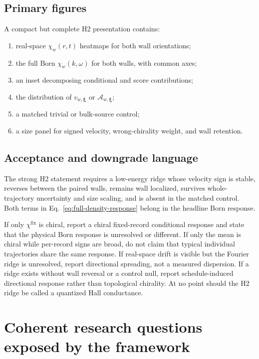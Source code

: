\documentclass[aps,prb,onecolumn,nofootinbib,superscriptaddress]{revtex4-2}
\newcommand{\bxi}{\bm{\xi}}
\newcommand{\fixed}{\mathrm{fix}}
\begin{document}
\subsection{Primary figures}

A compact but complete H2 presentation contains:
\begin{enumerate}
  \item real-space $\chi_w(r,t)$ heatmaps for both wall orientations;
  \item the full Born $\chi_w(k,\omega)$ for both walls, with common axes;
  \item an inset decomposing conditional and score contributions;
  \item the distribution of $v_{w,\bxi}$ or $\mathcal A_{w,\bxi}$;
  \item a matched trivial or bulk-source control;
  \item a size panel for signed velocity, wrong-chirality weight, and wall
  retention.
\end{enumerate}

\subsection{Acceptance and downgrade language}

The strong H2 statement requires a low-energy ridge whose velocity sign is
stable, reverses between the paired walls, remains wall localized, survives
whole-trajectory uncertainty and size scaling, and is absent in the matched
control.  Both terms in Eq.~\eqref{eq:full-density-response} belong in the
headline Born response.

If only $\chi^{\fixed}$ is chiral, report a chiral fixed-record conditional
response and state that the physical Born response is unresolved or different.
If only the mean is chiral while per-record signs are broad, do not claim that
typical individual trajectories share the same response.  If real-space drift
is visible but the Fourier ridge is unresolved, report directional spreading,
not a measured dispersion.  If a ridge exists without wall reversal or a
control null, report schedule-induced directional response rather than
topological chirality.  At no point should the H2 ridge be called a quantized
Hall conductance.

\section{Coherent research questions exposed by the framework}
\label{sec:questions}
\end{document}
